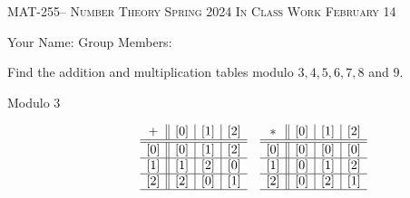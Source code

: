 \documentclass[handout]{ximera}
\date{February 14, 2024}
\begin{document}
\handoutAbstract
\maketitle
  \begin{center}%
    {\large \scshape MAT-255-- Number Theory \hfill Spring 2024 \hfill In Class Work February 14}%
    
    {\large
        Your Name: \hrulefill \quad Group Members:\hrulefill \quad \hrulefill
	\par}%
  \end{center}%


\begin{br}
    Find the addition and multiplication tables modulo $3,4,5,6,7,8$ and $9.$ 
    
    \begin{solution}
        \begin{description}
            \item[Modulo $3$] 
                \begin{align*}
                & \begin{array}{c||c|c|c}
                    + & [0] & [1] & [2]\\ \hline\hline
                    [0] & [0] & [1] & [2] \\ \hline
                    [1] & [1] & [2] & [0] \\ \hline
                    [2]  & [2] & [0]& [1]\\ \hline
                \end{array}
                & \begin{array}{c||c|c|c}
                    \ast & [0] & [1] & [2]\\ \hline\hline
                    [0] & [0] & [0] & [0] \\ \hline
                    [1] & [0] & [1] & [2] \\ \hline
                    [2] & [0] & [2]& [1]\\ \hline
                \end{array}
                \end{align*}
        

\end{description}
\end{solution}
\end{br}
\end{document}

